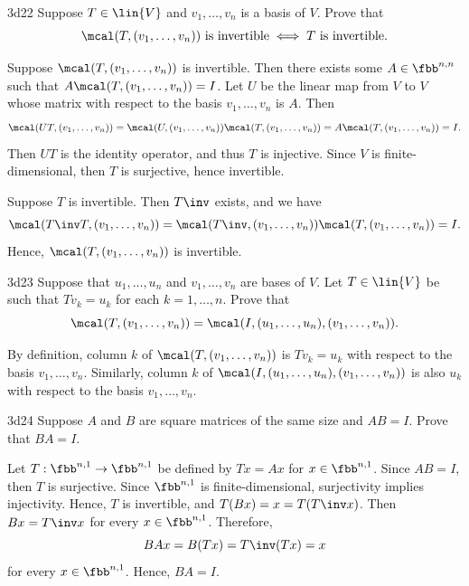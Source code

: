 \begin{exercise}{3d22}
    Suppose $T \in \lin{V}$ and $v_1, \ldots, v_n$ is a basis of $V$.
	Prove that
    \[
    	\mcal(T, (v_1, \ldots, v_n))~\text{is invertible} \iff T~\text{is invertible}.
    \]
\end{exercise}

\begin{sol}
    Suppose $\mcal(T, (v_1, \ldots, v_n))$ is invertible.
	Then there exists some $A \in \fbb^{n, n}$ such that $A\mcal(T, (v_1, \ldots, v_n)) = I$.
	Let $U$ be the linear map from $V$ to $V$ whose matrix with respect to the basis $v_1, \ldots, v_n$ is $A$.
	Then
    \[
    	\mcal(UT, (v_1, \ldots, v_n)) = \mcal(U, (v_1, \ldots, v_n))\mcal(T, (v_1, \ldots, v_n)) = A\mcal(T, (v_1, \ldots, v_n)) = I.
    \]
    Then $UT$ is the identity operator, and thus $T$ is injective.
	Since $V$ is finite-dimensional, then $T$ is surjective, hence invertible.

    Suppose $T$ is invertible.
	Then $T\inv$ exists, and we have
    \[
    	\mcal(T\inv T, (v_1, \ldots, v_n)) = \mcal(T\inv, (v_1, \ldots, v_n))\mcal(T, (v_1, \ldots, v_n)) = I.
    \]
    Hence, $\mcal(T, (v_1, \ldots, v_n))$ is invertible.
\end{sol}

\begin{exercise}{3d23}
    Suppose that $u_1, \ldots, u_n$ and $v_1, \ldots, v_n$ are bases of $V$.
	Let $T \in \lin{V}$ be such that $Tv_k = u_k$ for each $k = 1, \ldots, n$.
	Prove that
    \[
    	\mcal(T, (v_1, \ldots, v_n)) = \mcal(I, (u_1, \ldots, u_n), (v_1, \ldots, v_n)).
    \]
\end{exercise}

\begin{sol}
    By definition, column $k$ of $\mcal(T, (v_1, \ldots, v_n))$ is $Tv_k = u_k$ with respect to the basis $v_1, \ldots, v_n$.
	Similarly, column $k$ of $\mcal(I, (u_1, \ldots, u_n), (v_1, \ldots, v_n))$ is also $u_k$ with respect to the basis $v_1, \ldots, v_n$.
\end{sol}

\begin{exercise}{3d24}
    Suppose $A$ and $B$ are square matrices of the same size and $AB = I$.
	Prove that $BA = I$.
\end{exercise}

\begin{sol}
    Let $T : \fbb^{n, 1} \to \fbb^{n, 1}$ be defined by $Tx = Ax$ for $x \in \fbb^{n, 1}$.
	Since $AB = I$, then $T$ is surjective.
	Since $\fbb^{n, 1}$ is finite-dimensional, surjectivity implies injectivity.
	Hence, $T$ is invertible, and $T(Bx) = x = T(T\inv x)$.
	Then $Bx = T\inv x$ for every $x \in \fbb^{n, 1}$.
	Therefore,
    \[
    	BAx = B(Tx) = T\inv (Tx) = x
    \]
    for every $x \in \fbb^{n, 1}$.
	Hence, $BA = I$.
\end{sol}
